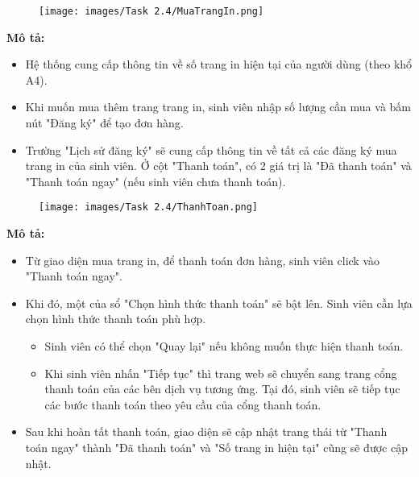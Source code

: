    \newpage
    \begin{center}
    \begin{figure}[!htp]
    \begin{center}
     \texttt{[image: images/Task 2.4/MuaTrangIn.png]}
    \end{center}
    \label{refhinh1}
    \end{figure}
    \end{center}

    \textbf{Mô tả:}
    \begin{itemize}
    \item Hệ thống cung cấp thông tin về số trang in hiện tại của người dùng (theo khổ A4).
    \item Khi muốn mua thêm trang trang in, sinh viên nhập số lượng cần mua và bấm nút "Đăng ký" để tạo đơn hàng.
    \item Trường "Lịch sử đăng ký" sẽ cung cấp thông tin về tất cả các đăng ký mua trang in của sinh viên. Ở cột "Thanh toán", có 2 giá trị là "Đã thanh toán" và "Thanh toán ngay" (nếu sinh viên chưa thanh toán).
    \end{itemize}

    \newpage
    \begin{center}
    \begin{figure}[!htp]
    \begin{center}
     \texttt{[image: images/Task 2.4/ThanhToan.png]}
    \end{center}
    \label{refhinh1}
    \end{figure}
    \end{center}

    \textbf{Mô tả:}
    \begin{itemize}
    \item Từ giao diện mua trang in, để thanh toán đơn hàng, sinh viên click vào "Thanh toán ngay".
    \item Khi đó, một của sổ "Chọn hình thức thanh toán" sẽ bật lên. Sinh viên cần lựa chọn hình thức thanh toán phù hợp.
    \begin{itemize}
        \item Sinh viên có thể chọn "Quay lại" nếu không muốn thực hiện thanh toán.
        \item Khi sinh viên nhấn "Tiếp tục" thì trang web sẽ chuyển sang trang cổng thanh toán của các bên dịch vụ tương ứng. Tại đó, sinh viên sẽ tiếp tục các bước thanh toán theo yêu cầu của cổng thanh toán.
    \end{itemize}
    \item Sau khi hoàn tất thanh toán, giao diện sẽ cập nhật trang thái từ "Thanh toán ngay" thành "Đã thanh toán" và "Số trang in hiện tại" cũng sẽ được cập nhật.
    \end{itemize}


